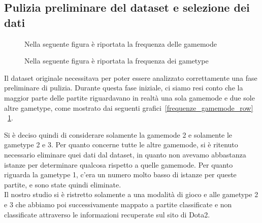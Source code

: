 \subsection{Pulizia preliminare del dataset e selezione dei dati}
\begin{figure}[htbp]
\centering
\begin{multicols}{2}
\hspace*{-0.15\linewidth}

\caption{Nella seguente figura è riportata la frequenza delle gamemode}
\label{frequenze_gamemode_row}
\hspace*{-0.15\linewidth}

\caption{Nella seguente figura è riportata la frequenza dei gametype}
\label{frequenze_gametype_row}
\end{multicols}
\end{figure} 
Il dataset originale necessitava per poter essere analizzato correttamente una fase preliminare di pulizia. Durante questa fase iniziale, ci siamo resi conto che la maggior parte delle partite riguardavano in realtà una sola gamemode e due sole altre gametype, come mostrato dai seguenti grafici~\ref{frequenze_gamemode_row} ~\ref{frequenze_gametype_row}.
\begin{figure}[htbp]
\centering

\caption{}
\label{frequenze_gamemode_gametype_clean}
\end{figure} 
Si è deciso quindi di considerare solamente la gamemode 2 e solamente le gametype 2 e 3. Per quanto concerne tutte le altre gamemode, si è ritenuto necessario eliminare quei dati dal dataset, in quanto non avevamo abbastanza istanze per determinare qualcosa rispetto a quelle gamemode. Per quanto riguarda la gametype 1, c'era un numero molto basso di istanze per queste partite, e sono state quindi eliminate. \\
Il nostro studio si è ristretto solamente a una modalità di gioco e alle gametype 2 e 3 che abbiamo poi successivamente mappato a partite classificate e non classificate attraverso le informazioni recuperate sul sito di Dota2. \\
